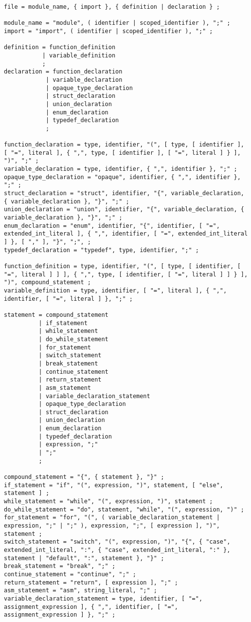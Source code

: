 \documentclass[letterpaper,12pt]{book}
\begin{document}
\begin{lstlisting}[breaklines=true]
file = module_name, { import }, { definition | declaration } ;

module_name = "module", ( identifier | scoped_identifier ), ";" ;
import = "import", ( identifier | scoped_identifier ), ";" ;

definition = function_definition
           | variable_definition
           ;
declaration = function_declaration
            | variable_declaration
            | opaque_type_declaration
            | struct_declaration
            | union_declaration
            | enum_declaration
            | typedef_declaration
            ;

function_declaration = type, identifier, "(", [ type, [ identifier ], [ "=", literal ], { ",", type, [ identifier ], [ "=", literal ] } ], ")", ";" ;
variable_declaration = type, identifier, { ",", identifier }, ";" ;
opaque_type_declaration = "opaque", identifier, { ",", identifier }, ";" ;
struct_declaration = "struct", identifier, "{", variable_declaration, { variable_declaration }, "}", ";" ;
union_declaration = "union", identifier, "{", variable_declaration, { variable_declaration }, "}", ";" ;
enum_declaration = "enum", identifier, "{", identifier, [ "=", extended_int_literal ], { ",", identifier, [ "=", extended_int_literal ] }, [ "," ], "}", ";", ;
typedef_declaration = "typedef", type, identifier, ";" ;

function_definition = type, identifier, "(", [ type, [ identifier, [ "=", literal ] ] ], { ",", type, [ identifier, [ "=", literal ] ] } ], ")", compound_statement ;
variable_definition = type, identifier, [ "=", literal ], { ",", identifier, [ "=", literal ] }, ";" ;

statement = compound_statement
          | if_statement
          | while_statement
          | do_while_statement
          | for_statement
          | switch_statement
          | break_statement
          | continue_statement
          | return_statement
          | asm_statement
          | variable_declaration_statement
          | opaque_type_declaration
          | struct_declaration
          | union_declaration
          | enum_declaration
          | typedef_declaration
          | expression, ";"
          | ";"
          ;

compound_statement = "{", { statement }, "}" ;
if_statement = "if", "(", expression, ")", statement, [ "else", statement ] ;
while_statement = "while", "(", expression, ")", statement ;
do_while_statement = "do", statement, "while", "(", expression, ")" ;
for_statement = "for", "(", ( variable_declaration_statement | expression, ";" | ";" ), expression, ";", [ expression ], ")", statement ;
switch_statement = "switch", "(", expression, ")", "{", { "case", extended_int_literal, ":", { "case", extended_int_literal, ":" }, statement | "default", ":", statement }, "}" ;
break_statement = "break", ";" ;
continue_statement = "continue", ";" ;
return_statement = "return", [ expression ], ";" ;
asm_statement = "asm", string_literal, ";" ;
variable_declaration_statement = type, identifier, [ "=", assignment_expression ], { ",", identifier, [ "=", assignment_expression ] }, ";" ;


\end{lstlisting}
\end{document}
